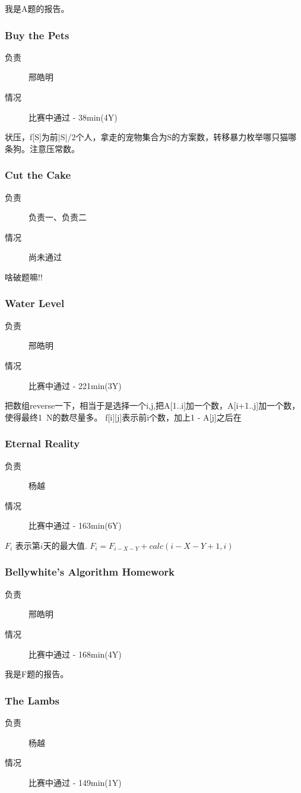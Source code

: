 \documentclass[a4paper, 11pt, nofonts, nocap, fancyhdr]{ctexart}
\newcommand{\problem}[1]{\subsubsection{#1}}
\begin{document}
我是A题的报告。

\problem{Buy the Pets}

\begin{description}
\item[负责] 邢皓明
\item[情况] 比赛中通过 - 38min(4Y)
\end{description}

状压，f[S]为前|{S}|/2个人，拿走的宠物集合为S的方案数，转移暴力枚举哪只猫哪条狗。注意压常数。

\problem{Cut the Cake}

\begin{description}
\item[负责] 负责一、负责二
\item[情况] 尚未通过
\end{description}

啥破题嘛!!

\problem{Water Level}

\begin{description}
\item[负责] 邢皓明
\item[情况] 比赛中通过 - 221min(3Y)
\end{description}

把数组reverse一下，相当于是选择一个i,j,把A[1..i]加一个数，A[i+1..j]加一个数，使得最终1~N的数尽量多。
f[i][j]表示前i个数，加上1 - A[j]之后在

\problem{Eternal Reality}

\begin{description}
\item[负责] 杨越
\item[情况] 比赛中通过 - 163min(6Y)
\end{description}

$F_i$ 表示第$i$天的最大值. $F_i = F_{i-X-Y} + calc(i-X-Y+1, i)$ 

\problem{Bellywhite's Algorithm Homework}

\begin{description}
\item[负责] 邢皓明
\item[情况] 比赛中通过 - 168min(4Y)
\end{description}

我是F题的报告。

\problem{The Lambs}

\begin{description}
\item[负责] 杨越
\item[情况] 比赛中通过 - 149min(1Y)
\end{description}
\end{document}
